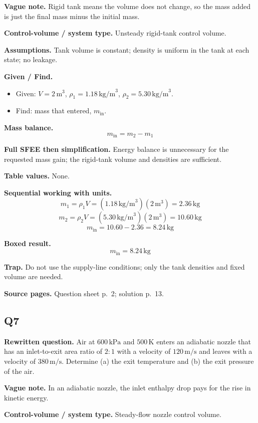 \textbf{Vague note.} Rigid tank means the volume does not change, so the mass added is just the final mass minus the initial mass.

\textbf{Control-volume / system type.} Unsteady rigid-tank control volume.

\textbf{Assumptions.} Tank volume is constant; density is uniform in the tank at each state; no leakage.

\textbf{Given / Find.}
\begin{itemize}
  \item Given: $V=2\,\text{m}^3$, $\rho_1=1.18\,\text{kg/m}^3$, $\rho_2=5.30\,\text{kg/m}^3$.
  \item Find: mass that entered, $m_{\text{in}}$.
\end{itemize}

\textbf{Mass balance.}
\[
 m_{\text{in}} = m_2-m_1
\]

\textbf{Full SFEE then simplification.} Energy balance is unnecessary for the requested mass gain; the rigid-tank volume and densities are sufficient.

\textbf{Table values.} None.

\textbf{Sequential working with units.}
\[
 m_1 = \rho_1V = (1.18\,\text{kg/m}^3)(2\,\text{m}^3)=2.36\,\text{kg}
\]
\[
 m_2 = \rho_2V = (5.30\,\text{kg/m}^3)(2\,\text{m}^3)=10.60\,\text{kg}
\]
\[
 m_{\text{in}} = 10.60-2.36 = 8.24\,\text{kg}
\]

\textbf{Boxed result.}
\[
\boxed{m_{\text{in}} = 8.24\,\text{kg}}
\]

\textbf{Trap.} Do not use the supply-line conditions; only the tank densities and fixed volume are needed.

\textbf{Source pages.} Question sheet p.~2; solution p.~13.

\subsection*{Q7}
\textbf{Rewritten question.} Air at $600\,\text{kPa}$ and $500\,\text{K}$ enters an adiabatic nozzle that has an inlet-to-exit area ratio of $2{:}1$ with a velocity of $120\,\text{m/s}$ and leaves with a velocity of $380\,\text{m/s}$. Determine (a) the exit temperature and (b) the exit pressure of the air.

\textbf{Vague note.} In an adiabatic nozzle, the inlet enthalpy drop pays for the rise in kinetic energy.

\textbf{Control-volume / system type.} Steady-flow nozzle control volume.

